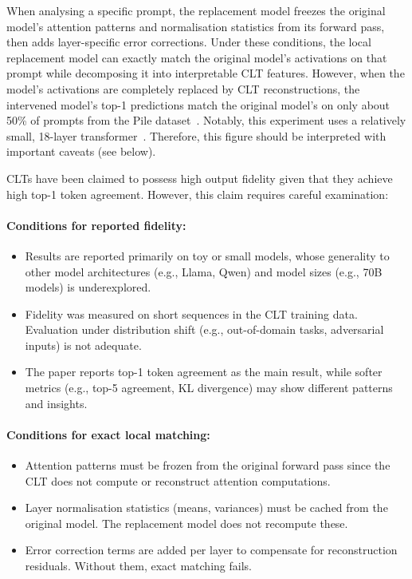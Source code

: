 When analysing a specific prompt, the replacement model freezes the original model's attention patterns and normalisation statistics from its forward pass, then adds layer-specific error corrections. Under these conditions, the local replacement model can exactly match the original model's activations on that prompt while decomposing it into interpretable CLT features. However, when the model's activations are completely replaced by CLT reconstructions, the intervened model's top-1 predictions match the original model's on only about 50\% of prompts from the Pile dataset~. Notably, this experiment uses a relatively small, 18-layer transformer~. Therefore, this figure should be interpreted with important caveats (see below).

\begin{warningbox}

CLTs have been claimed to possess high output fidelity given that they achieve high top-1 token agreement. However, this claim requires careful examination:\\

\paragraph{Conditions for reported fidelity:}
\begin{itemize}
    \item Results are reported primarily on toy or small models, whose generality to other model architectures (e.g., Llama, Qwen) and model sizes (e.g., 70B models) is underexplored.
    \item Fidelity was measured on short sequences in the CLT training data. Evaluation under distribution shift (e.g., out-of-domain tasks, adversarial inputs) is not adequate.
    \item The paper reports top-1 token agreement as the main result, while softer metrics (e.g., top-5 agreement, KL divergence) may show different patterns and insights.
\end{itemize}

\paragraph{Conditions for exact local matching:}
\begin{itemize}
    \item Attention patterns must be frozen from the original forward pass since the CLT does not compute or reconstruct attention computations.
    \item Layer normalisation statistics (means, variances) must be cached from the original model. The replacement model does not recompute these.
    \item Error correction terms are added per layer to compensate for reconstruction residuals. Without them, exact matching fails.
\end{itemize}


\end{warningbox}
